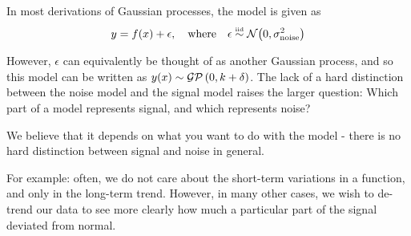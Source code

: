 In most derivations of Gaussian processes, the model is given as
%
\begin{align}
y = f(x) + \epsilon, \quad \textnormal{where} \quad \epsilon \overset{\mbox{\tiny iid}}{\sim} \mathcal{N}\!\left(0,\sigma^2_{\textnormal{noise}}\right)
\end{align}

However, $\epsilon$ can equivalently be thought of as another Gaussian process, and so this model can be written as $y(x) \sim \mathcal{GP}\left(0, k + \delta \right)$.  The lack of a hard distinction between the noise model and the signal model raises the larger question:  Which part of a model represents signal, and which represents noise?

We believe that it depends on what you want to do with the model - there is no hard distinction between signal and noise in general.

For example: often, we do not care about the short-term variations in a function, and only in the long-term trend.
However, in many other cases, we wish to de-trend our data to see more clearly how much a particular part of the signal deviated from normal.

\fi






\outbpdocument{


}

